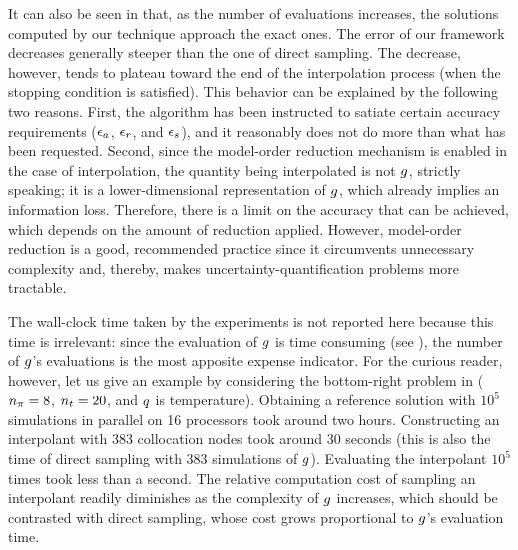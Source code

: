 It can also be seen in  that, as the number of evaluations
increases, the solutions computed by our technique approach the exact ones. The
error of our framework decreases generally steeper than the one of direct
sampling. The decrease, however, tends to plateau toward the end of the
interpolation process (when the stopping condition is satisfied). This behavior
can be explained by the following two reasons. First, the algorithm has been
instructed to satiate certain accuracy requirements ($\epsilon_a$, $\epsilon_r$, and
$\epsilon_s$), and it reasonably does not do more than what has been requested.
Second, since the model-order reduction mechanism is enabled in the case of
interpolation, the quantity being interpolated is not $g$, strictly speaking;
it is a lower-dimensional representation of $g$, which already implies an
information loss. Therefore, there is a limit on the accuracy that can be
achieved, which depends on the amount of reduction applied. However, model-order
reduction is a good, recommended practice since it circumvents unnecessary
complexity and, thereby, makes uncertainty-quantification problems more
tractable.

\begin{remark}
The wall-clock time taken by the experiments is not reported here because this
time is irrelevant: since the evaluation of $g$ is time consuming (see
), the number of $g$'s evaluations is the most apposite expense
indicator. For the curious reader, however, let us give an example by
considering the bottom-right problem in  (${n_\pi} = 8$, ${n_t} = 20$,
and $q$ is temperature). Obtaining a reference solution with $10^5$ simulations
in parallel on 16 processors took around two hours. Constructing an interpolant
with 383 collocation nodes took around 30 seconds (this is also the time of
direct sampling with 383 simulations of $g$). Evaluating the interpolant $10^5$
times took less than a second. The relative computation cost of sampling an
interpolant readily diminishes as the complexity of $g$ increases, which should
be contrasted with direct sampling, whose cost grows proportional to $g$'s
evaluation time.
\end{remark}
